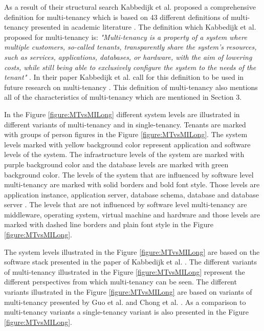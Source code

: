 \documentclass[conference]{sasmoota2017}
\begin{document}
As a result of their structural search Kabbedijk et al. proposed a comprehensive definition for multi-tenancy which is based on 43 different definitions of multi-tenancy presented in academic literature \cite{Kabbedijk2015:Defining}. The definition which Kabbedijk et al. proposed for multi-tenancy is: \textit{"Multi-tenancy is a property of a system where multiple customers, so-called tenants, transparently share the system's resources, such as services, applications, databases, or hardware, with the aim of lowering costs, while still being able to exclusively configure the system to the needs of the tenant"} \cite{Kabbedijk2015:Defining}. In their paper Kabbedijk et al. call for this definition to be used in future research on multi-tenancy \cite{Kabbedijk2015:Defining}. This definition of multi-tenancy also mentions all of the characteristics of multi-tenancy which are mentioned in Section 3. 

In the Figure \ref{figure:MTvsMILong} different system levels are illustrated in different variants of multi-tenancy and in single-tenancy. Tenants are marked with groups of person figures in the Figure \ref{figure:MTvsMILong}. The system levels marked with yellow background color represent application and software levels of the system. The infrastructure levels of the system are marked with purple background color and the database levels are marked with green background color. The levels of the system that are influenced by software level multi-tenancy are marked with solid borders and bold font style. Those levels are application instance, application server, database schema, database and database server \cite{Kabbedijk2015:Defining}. The levels that are not influenced by software level multi-tenancy are middleware, operating system, virtual machine and hardware and those levels are marked with dashed line borders and plain font style in the Figure \ref{figure:MTvsMILong}. 

The system levels illustrated in the Figure \ref{figure:MTvsMILong} are based on the software stack presented in the paper of Kabbedijk et al. \cite{Kabbedijk2015:Defining}. The different variants of multi-tenancy illustrated in the Figure \ref{figure:MTvsMILong} represent the different perspectives from which multi-tenancy can be seen. The different variants illustrated in the Figure \ref{figure:MTvsMILong} are based on variants of multi-tenancy presented by Guo et al. \cite{Guo:2007:FrameworkForNative} and Chong et al. \cite{Chong:2006:MultiTenantDataArchitecture}. As a comparison to multi-tenancy variants a single-tenancy variant is also presented in the Figure \ref{figure:MTvsMILong}. 
\end{document}
